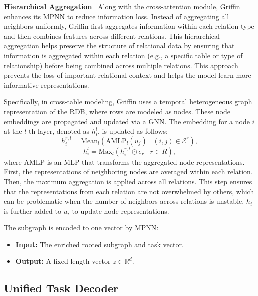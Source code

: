 \documentclass{article}
\theoremstyle{plain}
\theoremstyle{definition}
\theoremstyle{remark}
\begin{document}
\textbf{Hierarchical Aggregation}~
Along with the cross-attention module, Griffin enhances its MPNN to reduce information loss. Instead of aggregating all neighbors uniformly, Griffin first aggregates information within each relation type and then combines features across different relations.
This hierarchical aggregation helps preserve the structure of relational data by ensuring that information is aggregated within each relation (e.g., a specific table or type of relationship) before being combined across multiple relations. This approach prevents the loss of important relational context and helps the model learn more informative representations.

Specifically, in cross-table modeling, Griffin uses a temporal heterogeneous graph representation of the RDB, where rows are modeled as nodes. These node embeddings are propagated and updated via a GNN. The embedding for a node $i$ at the $l$-th layer, denoted as $h_i^{l}$, is updated as follows:
\begin{equation}
h_i^{r,l} = \text{Mean}_l\left( \text{AMLP}_l(u_j) \mid (i, j) \in \mathcal{E}^r \right),
\end{equation}
\vspace*{-0.3cm}
\begin{equation}
h_i^l = \text{Max}_l\left( h_i^{r,l} \odot e_r \mid r \in R \right),
\end{equation}
where $\text{AMLP}$ is an MLP that transforms the aggregated node representations. First, the representations of neighboring nodes are averaged within each relation. Then, the maximum aggregation is applied across all relations. This step ensures that the representations from each relation are not overwhelmed by others, which can be problematic when the number of neighbors across relations is unstable. $h_i$ is further added to $u_i$ to update node representations.

The subgraph is encoded to one vector by MPNN:
\begin{itemize}
[itemsep=2pt,topsep=-2pt,parsep=0pt,leftmargin=10pt]
\item \textbf{Input:} The enriched rooted subgraph and task vector.
\item \textbf{Output:} A fixed-length vector $z \in \mathbb{R}^d$.
\end{itemize}


\subsection{Unified Task Decoder}\label{sec:unify_dec}
\end{document}
